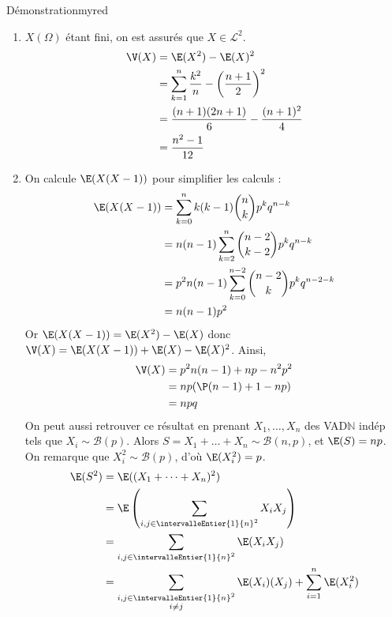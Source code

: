     \begin{demo}{Démonstration}{myred}
        \begin{enumerate}
            \item $X(\Omega)$ étant fini, on est assurés que $X \in \mathcal{L}^2$.
            \begin{align*}
                \V(X) 
                &= \E(X^2) - \E(X)^2 \\
                &= \sum_{k =1}^n \frac{k^2}{n} - \left( \frac{n +1}{2} \right)^2 \\
                &= \frac{(n+1)(2n+1)}{6} - \frac{(n+1)^2}{4} \\
                &= \frac{n^2 - 1}{12}
            \end{align*}
            \item On calcule $\E(X(X-1))$ pour simplifier les calculs : 
            \begin{align*}
                \E(X(X-1)) 
                &= \sum_{k=0}^{n} k (k-1) \binom{n}{k} p^k q^{n-k} \\
                &= n(n-1) \sum_{k=2}^{n} \binom{n-2}{k-2} p^k q^{n-k} \\
                &= p^2 n (n-1) \sum_{k=0}^{n-2} \binom{n-2}{k} p^{k} q^{n-2 - k} \\
                &= n(n-1) p^2
            \end{align*}
            Or $\E(X(X-1)) = \E(X^2) - \E(X)$ donc $\V(X) = \E(X(X-1)) + \E(X) - \E(X)^2$. Ainsi, 
            \begin{align*}
                \V(X) 
                &= p^2 n(n-1) + np - n^2 p^2 \\
                &= np (\P(n-1) + 1 - np) \\
                &= npq
            \end{align*}
            On peut aussi retrouver ce résultat en prenant $X_1,\ldots,X_n$ des VAD$\mathbb{N}$ indép tels que $X_i \sim \mathcal{B}(p)$. Alors $S = X_1 + \ldots + X_n \sim \mathcal{B}(n,p)$, et $\E(S) = np$. On remarque que $X_i^2 \sim \mathcal{B}(p)$, d’où $\E(X_i^2) = p$.
            \begin{align*}
                \E(S^2) 
                &= \E((X_1 + \cdots + X_n)^2) \\
                &= \E\left(\sum_{i,j \in \intervalleEntier{1}{n}^2} X_i X_j\right) \\
                &= \sum_{i,j \in \intervalleEntier{1}{n}^2} \E(X_i X_j) \\
                &= \sum_{\substack{i,j \in \intervalleEntier{1}{n}^2 \\ i \neq j}} \E(X_i)(X_j) + \sum_{i = 1}^n \E(X_i^2) \\

\end{align*}
\end{enumerate}
\end{demo}
